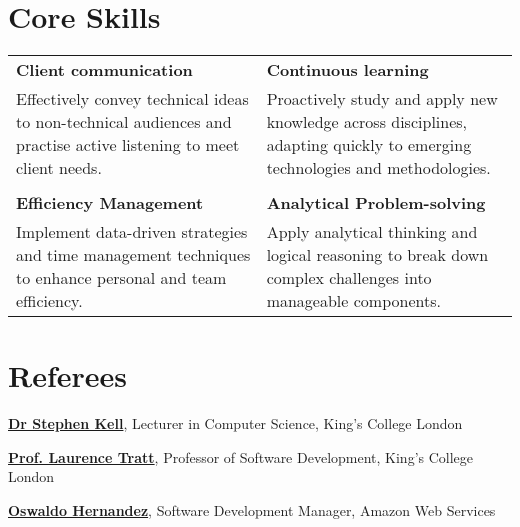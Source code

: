 \documentclass[11pt,a4paper]{article}
\begin{document}
    \section{Core Skills}
    \begin{tabular}{p{} p{}}
    \textbf{Client communication} & \textbf{Continuous learning} \\
    Effectively convey technical ideas to non-technical audiences and practise active listening to meet client needs. & 
    
    Proactively study and apply new knowledge across disciplines, adapting quickly to emerging technologies and methodologies. \\ \\
    \textbf{Efficiency Management} & \textbf{Analytical Problem-solving} \\
    Implement data-driven strategies and time management techniques to enhance personal and team efficiency. & 
    
    Apply analytical thinking and logical reasoning to break down complex challenges into manageable components. \\
    \end{tabular}
    
    
    \section{Referees}
    
    \begin{flushleft}
    \href{https://www.kcl.ac.uk/people/stephen-kell}{\textbf{Dr Stephen Kell}}, Lecturer in Computer Science, King's College London
    
    \href{https://www.kcl.ac.uk/people/laurence-tratt}{\textbf{Prof. Laurence Tratt}}, Professor of Software Development, King's College London
    
    \href{mailto:oswaldhs@amazon.co.uk}{\textbf{Oswaldo Hernandez}}, Software Development Manager, Amazon Web Services
    \end{flushleft}
    
\end{document}
